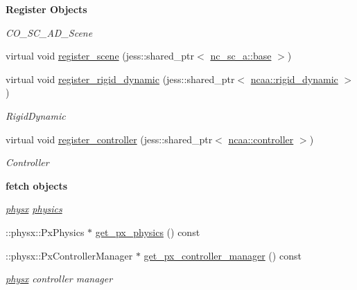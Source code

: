 \begin{Indent}{\bf Register Objects}\par
{\em \label{_amgrp6a304d42496b952c380b92415f075c10}
 CO\_\-SC\_\-AD\_\-Scene }\begin{DoxyCompactItemize}
\item 
virtual void \hyperlink{classnebula_1_1content_1_1physics_1_1physx_1_1base_a3c01f6c425f68341bed6a71f2ff52919}{register\_\-scene} (jess::shared\_\-ptr$<$ \hyperlink{classnebula_1_1content_1_1scene_1_1admin_1_1base}{nc\_\-sc\_\-a::base} $>$)
\item 
virtual void \hyperlink{classnebula_1_1content_1_1physics_1_1physx_1_1base_a23f4f739171151f95ab7e08e1bcb5504}{register\_\-rigid\_\-dynamic} (jess::shared\_\-ptr$<$ \hyperlink{classnebula_1_1content_1_1actor_1_1admin_1_1rigid__dynamic}{ncaa::rigid\_\-dynamic} $>$)
\begin{DoxyCompactList}\small\item\em RigidDynamic \item\end{DoxyCompactList}\item 
virtual void \hyperlink{classnebula_1_1content_1_1physics_1_1physx_1_1base_a6c4dcfefecc75adb38939f189592ba56}{register\_\-controller} (jess::shared\_\-ptr$<$ \hyperlink{classnebula_1_1content_1_1actor_1_1admin_1_1controller}{ncaa::controller} $>$)
\begin{DoxyCompactList}\small\item\em Controller \item\end{DoxyCompactList}\end{DoxyCompactItemize}
\end{Indent}
\begin{Indent}{\bf fetch objects}\par
{\em \label{_amgrpb712734d7b6a37d417e36727149b52a3}
 \hyperlink{namespacenebula_1_1content_1_1physics_1_1physx}{physx} \hyperlink{namespacenebula_1_1content_1_1physics}{physics} }\begin{DoxyCompactItemize}
\item 
::physx::PxPhysics $\ast$ \hyperlink{classnebula_1_1content_1_1physics_1_1physx_1_1base_a64f40aec9f4c33d419cc767a0ba331dd}{get\_\-px\_\-physics} () const 
\item 
::physx::PxControllerManager $\ast$ \hyperlink{classnebula_1_1content_1_1physics_1_1physx_1_1base_a2cbe05d51dd543c4a073bf233ed9ee06}{get\_\-px\_\-controller\_\-manager} () const 
\begin{DoxyCompactList}\small\item\em \hyperlink{namespacenebula_1_1content_1_1physics_1_1physx}{physx} controller manager \item\end{DoxyCompactList}\end{DoxyCompactItemize}
\end{Indent}
